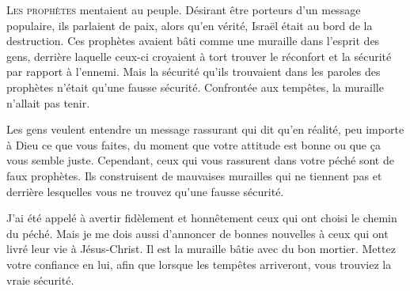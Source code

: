




\lettrine{L}{es prophètes} mentaient au peuple.
 Désirant être porteurs d'un message populaire, ils parlaient de paix,
 alors qu'en vérité, Israël était au bord de la destruction.
 Ces prophètes avaient bâti comme une \Og muraille \Fg{}
 dans l'esprit des gens, derrière laquelle 
 ceux-ci croyaient à tort trouver le réconfort et la sécurité par rapport
 à l'ennemi. Mais la sécurité qu'ils trouvaient dans les paroles
 des prophètes n'était qu'une fausse sécurité.
 Confrontée aux tempêtes, la \Og muraille \Fg{} n'allait pas tenir. 


Les gens veulent entendre un message rassurant qui dit
  qu'en réalité,
 peu importe à Dieu ce que vous faites, du moment que votre attitude est bonne
 ou que \c{c}a vous semble juste.
 Cependant, ceux qui vous rassurent dans votre péché sont de faux prophètes.
 Ils construisent de mauvaises murailles qui ne tiennent pas et
 derrière lesquelles 
 vous ne trouvez qu'une fausse sécurité. 

J'ai été appelé à avertir fidèlement et honnêtement ceux qui ont choisi
 le chemin du péché. Mais je me dois aussi d'annoncer de bonnes nouvelles
 à ceux qui ont livré leur vie à Jésus-Christ.
 Il est la muraille bâtie avec du bon mortier. Mettez votre confiance en lui,
 afin que lorsque les tempêtes arriveront, vous trouviez la vraie sécurité. 

